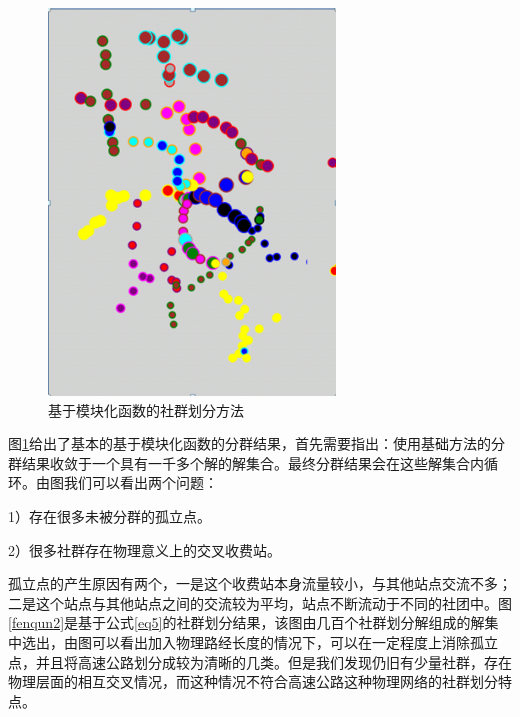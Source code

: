 			\begin{figure}[h]
			\centering
					\begin{minipage}{0.8\linewidth}
						\centering
						\includegraphics[width=3in]{picture/liuliangbianquan}
						\caption{基于模块化函数的社群划分方法}
						\label{gulidian}
					\end{minipage}
			\end{figure}

		图\ref{gulidian}给出了基本的基于模块化函数的分群结果，首先需要指出：使用基础方法的分群结果收敛于一个具有一千多个解的解集合。最终分群结果会在这些解集合内循环。由图我们可以看出两个问题：

		1）存在很多未被分群的孤立点。

		2）很多社群存在物理意义上的交叉收费站。

		孤立点的产生原因有两个，一是这个收费站本身流量较小，与其他站点交流不多；二是这个站点与其他站点之间的交流较为平均，站点不断流动于不同的社团中。图\ref{fenqun2}是基于公式\ref{eq5}的社群划分结果，该图由几百个社群划分解组成的解集中选出，由图可以看出加入物理路经长度的情况下，可以在一定程度上消除孤立点，并且将高速公路划分成较为清晰的几类。但是我们发现仍旧有少量社群，存在物理层面的相互交叉情况，而这种情况不符合高速公路这种物理网络的社群划分特点。

